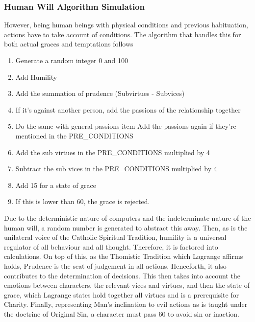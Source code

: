 \documentclass[12pt]{article}
\begin{document}
\subsubsection{Human Will Algorithm Simulation}
However, being human beings with physical conditions and previous habituation, actions have to take account of conditions. The algorithm that handles this for both actual graces and temptations follows\:

\begin{enumerate}
	\item Generate a random integer 0 and 100
	\item Add Humility 
	\item Add the summation of prudence (Subvirtues - Subvices) 
	\item If it's against another person, add the passions of the relationship together
	\item Do the same with general passions
	item Add the passions again if they're mentioned in the PRE\_CONDITIONS
	\item Add the sub virtues in the PRE\_CONDITIONS multiplied by 4
	\item Subtract the sub vices in the PRE\_CONDITIONS multiplied by 4
	\item Add 15 for a state of grace
	\item If this is lower than 60, the grace is rejected.
\end{enumerate}

Due to the deterministic nature of computers and the indeterminate nature of the human will, a random number is generated to abstract this away. Then, as is the unilateral voice of the Catholic Spiritual Tradition, humility is a universal regulator of all behaviour and all thought. Therefore, it is factored into calculations. On top of this, as the Thomistic Tradition which Lagrange affirms holds, Prudence is the seat of judgement in all actions. Henceforth, it also contributes to the determination of decisions. This then takes into account the emotions between characters, the relevant vices and virtues, and then the state of grace, which Lagrange states hold together all virtues and is a prerequisite for Charity. Finally, representing Man's inclination to evil actions as is taught under the doctrine of Original Sin, a character must pass 60 to avoid sin or inaction. \\
\end{document}
